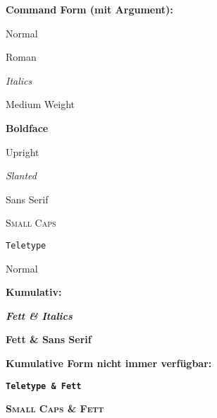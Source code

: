 \documentclass[a5paper]{article}
\begin{document}
\textbf{Command Form (mit Argument):}

\begin{example}
Normal
\end{example}

\begin{example}
\textrm{Roman}
\end{example}

\begin{example}
\textit{Italics}
\end{example}

\begin{example}
\textmd{Medium Weight}
\end{example}

\begin{example}
\textbf{Boldface}
\end{example}

\begin{example}
\textup{Upright}
\end{example}

\begin{example}
\textsl{Slanted}
\end{example}

\begin{example}
\textsf{Sans Serif}
\end{example}

\begin{example}
\textsc{Small Caps}
\end{example}

\begin{example}
\texttt{Teletype}
\end{example}

\begin{example}
\textnormal{Normal}
\end{example}

\bigskip

\textbf{Kumulativ:}

\begin{example}
\textit{\textbf{Fett \& Italics}}
\end{example}

\begin{example}
\textsf{\textbf{Fett \& Sans Serif}}
\end{example}

\bigskip

\textbf{Kumulative Form nicht immer verfügbar:}

\begin{example}
\texttt{\textbf {Teletype \& Fett}}
\end{example}

\begin{example}
\textsc{\textbf {Small Caps \& Fett}}
\end{example}
\end{document}
